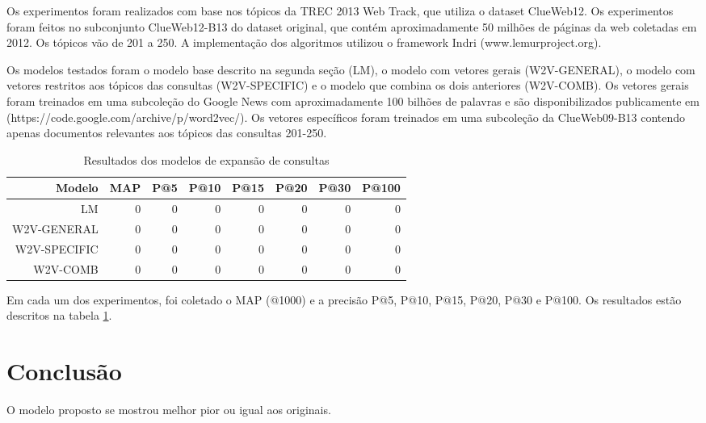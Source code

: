 \documentclass{article}
\begin{document}
Os experimentos foram realizados com base nos tópicos da TREC 2013 Web Track, que utiliza o dataset ClueWeb12. Os experimentos
foram feitos no subconjunto ClueWeb12-B13 do dataset original, que contém aproximadamente 50 milhões de páginas da web coletadas
em 2012. Os tópicos vão de 201 a 250. A implementação dos algoritmos utilizou o framework Indri (www.lemurproject.org). 

Os modelos testados foram o modelo base descrito na segunda seção (LM), o modelo com vetores gerais (W2V-GENERAL), o modelo
com vetores restritos aos tópicos das consultas (W2V-SPECIFIC) e o modelo que combina os dois anteriores (W2V-COMB). Os vetores
gerais foram treinados em uma subcoleção do Google News com aproximadamente 100 bilhões de palavras e são disponibilizados publicamente
em (https://code.google.com/archive/p/word2vec/). Os vetores específicos foram treinados em uma subcoleção da ClueWeb09-B13 contendo
apenas documentos relevantes aos tópicos das consultas 201-250.

\begin{center}
  \begin{table}
  \centering
  \begin{tabular}{ | r r r r r r r r | }
    \hline
    Modelo & MAP & P@5 & P@10 & P@15 & P@20 & P@30 & P@100 \\
    \hline
    LM & 0 & 0 & 0 & 0 & 0 & 0 & 0 \\
    W2V-GENERAL & 0 & 0 & 0 & 0 & 0 & 0 & 0 \\
    W2V-SPECIFIC & 0 & 0 & 0 & 0 & 0 & 0 & 0 \\
    W2V-COMB & 0 & 0 & 0 & 0 & 0 & 0 & 0 \\
    \hline
  \end{tabular}
  \caption{Resultados dos modelos de expansão de consultas}
  \label{tab:experiments}
  \end{table}
\end{center}

Em cada um dos experimentos, foi coletado o MAP (@1000) e a precisão P@5, P@10, P@15, P@20, P@30 e P@100. Os resultados estão descritos na 
tabela \ref{tab:experiments}.

\section{Conclusão}

O modelo proposto se mostrou melhor pior ou igual aos originais.

 

\end{document}
